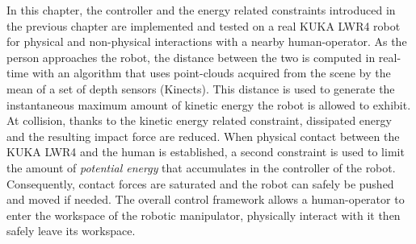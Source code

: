 \begin{synopsis}
In this chapter, the controller and the energy related constraints introduced in the previous chapter are implemented and tested on a real KUKA LWR4 robot for physical and non-physical interactions with a nearby human-operator. As the person approaches the robot, the distance between the two is computed in real-time with an algorithm that uses point-clouds acquired from the scene by the mean of a set of depth sensors (Kinects). This distance is used to generate the instantaneous maximum amount of kinetic energy the robot is allowed to exhibit. At collision, thanks to the kinetic energy related constraint, dissipated energy and the resulting impact force are reduced. When physical contact between the KUKA LWR4 and the human is established, a second constraint is used to limit the amount of \textit{potential energy} that accumulates in the controller of the robot. Consequently, contact forces are saturated and the robot can safely be pushed and moved if needed. The overall control framework allows a human-operator to enter the workspace of the robotic manipulator, physically interact with it then safely leave its workspace.
%
%
\end{synopsis}
